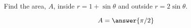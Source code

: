 \documentclass{ximera}
\author{David Guichard \and Neal Koblitz \and H. Jerome Keisler \and Albert Scheller \and Barry Balof \and Mike Wills \and Matthew Carr}
\begin{document}
\begin{exercise}





Find the area, $A$, inside $r=1+\sin\theta$ and outside $r=2\sin\theta$.
\begin{prompt}
\[
A=\answer{\pi/2}
\]
\end{prompt}



\end{exercise}
\end{document}
